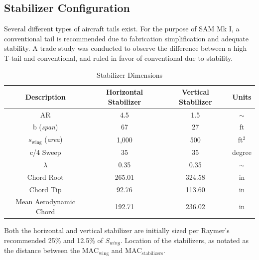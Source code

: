 \subsection{Stabilizer Configuration}
Several different types of aircraft tails exist.  For the purpose of SAM Mk I, a conventional tail is recommended due to fabrication simplification and adequate stability.  A trade study was conducted to observe the difference between a high T-tail and conventional, and ruled in favor of conventional due to stability.
\begin{table}[!h]
    \centering
    \caption{Stabilizer Dimensions}
    \begin{tabular}{|c||c|c|c|} \toprule
        \textbf{Description} & {\textbf{Horizontal Stabilizer}} & 
        {\textbf{Vertical Stabilizer}} & \textbf{Units}\\ \hline \hline
        AR & 4.5 & 1.5 & $\sim$ \\ \hline
        b (\textit{span}) & 67 & 27 & ft \\ \hline 
        $s_{\text{wing}}$ (\textit{area}) & 1,000 & 500 & ft$^2$ \\ \hline
        c/4 Sweep & 35 & 35 & degree \\ \hline
        $\lambda$ & 0.35 & 0.35 & $\sim$ \\ \hline
        Chord Root & 265.01 & 324.58 & in \\ \hline
        Chord Tip & 92.76 & 113.60 & in \\ \hline   
        Mean Aerodynamic Chord & 192.71 & 236.02 & in \\ \bottomrule
    \end{tabular}
    \label{tab:stabsizing}
\end{table}

Both the horizontal and vertical stabilizer are initially sized per Raymer's recommended 25\% and 12.5\% of $S_{wing}$.\cite{raymer}  Location of the stabilizers, as notated as the distance between the $\text{MAC}_{\text{wing}}$ and $\text{MAC}_{\text{stabilizers}}$.

